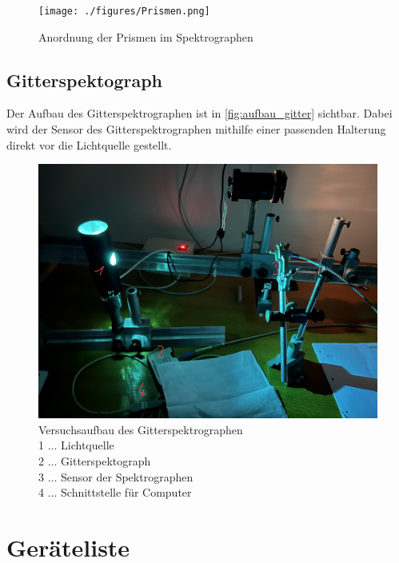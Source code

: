 \documentclass[12pt,english,ngerman]{scrartcl}
\begin{document}
\begin{figure}[H]
	\begin{center}
		\texttt{[image: ./figures/Prismen.png]}
	\end{center}
	\caption[Anordnung der Prismen im Spektrographen]
	{Anordnung der Prismen im Spektrographen
	}\label{fig:prismen}
\end{figure}

\subsection{Gitterspektograph}

Der Aufbau des Gitterspektrographen ist in \autoref{fig:aufbau_gitter} sichtbar. Dabei wird der Sensor des Gitterspektrographen
mithilfe einer passenden Halterung direkt vor die Lichtquelle gestellt.
\begin{figure}[H]
	\begin{center}
		\includegraphics[width =\textwidth]{./figures/Gitterspektograph.png}
	\end{center}
	\caption[Versuchsaufbau des Gitterspektrographen]
	{Versuchsaufbau des Gitterspektrographen \\
	1 \(\dots\) Lichtquelle \\
	2 \(\dots\) Gitterspektograph \\
	3 \(\dots\) Sensor der Spektrographen \\
	4 \(\dots\) Schnittstelle für Computer
	}\label{fig:aufbau_gitter}
\end{figure}


\section{Geräteliste}
\label{sec:geraeteliste}
\end{document}
